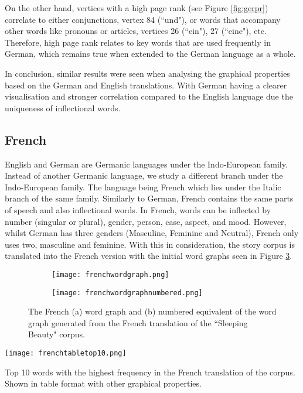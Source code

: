 On the other hand, vertices with a high page rank (see Figure \ref{fig:gerpr}) correlate to either conjunctions, vertex 84 (``und"), or words that accompany other words like pronouns or articles, vertices 26 (``ein"), 27 (``eine"), etc. Therefore, high page rank relates to key words that are used frequently in German, which remains true when extended to the German language as a whole.

In conclusion, similar results were seen when analysing the graphical properties based on the German and English translations. With German having a clearer visualisation and stronger correlation compared to the English language due the uniqueness of inflectional words.

\subsection{French}
English and German are Germanic languages under the Indo-European family. Instead of another Germanic language, we study a different branch under the Indo-European family. The language being French which lies under the Italic branch of the same family. Similarly to German, French contains the same parts of speech and also inflectional words. In French, words can be inflected by number (singular or plural), gender, person, case, aspect, and mood. However, whilst German has three genders (Masculine, Feminine and Neutral), French \cite{hawkins2015french} only uses two, masculine and feminine. With this in consideration, the story corpus is translated into the French version with the initial word graphs seen in Figure \ref{fig:fregraph}. 

\begin{figure}[!htb]
\centering
\begin{subfigure}{.45\textwidth}
	\texttt{[image: frenchwordgraph.png]}
	\caption{}
	\label{fig:freword}
\end{subfigure}
\hfill
\begin{subfigure}{.45\textwidth}
	\texttt{[image: frenchwordgraphnumbered.png]}
	\caption{}
	\label{fig:frenum}
\end{subfigure}
\caption{The French (a) word graph and (b) numbered equivalent of the word graph generated from the French translation of the ``Sleeping Beauty" corpus.}
\label{fig:fregraph}
\end{figure}

\begin{table}[!htb]
\centering
\texttt{[image: frenchtabletop10.png]}
\caption{Top 10 words with the highest frequency in the French translation of the corpus. Shown in table format with other graphical properties. }
\label{table:frenchtop}
\end{table}


